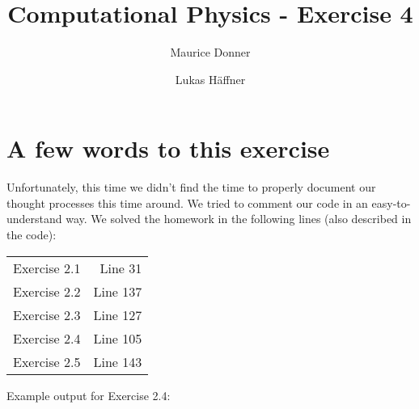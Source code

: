 \documentclass{article}
\title{Computational Physics - Exercise 4}
\author{Maurice Donner \and Lukas Häffner}
\begin{document}
\maketitle

\section{A few words to this exercise}

Unfortunately, this time we didn't find the time to properly document our
thought processes this time around. We tried to comment our code in an
easy-to-understand way. We solved the homework in the following lines
(also described in the code):\\ 
\begin{center}
\begin{tabular}{lr}
    Exercise 2.1 & Line 31\\
    Exercise 2.2 & Line 137 \\
    Exercise 2.3 & Line 127 \\
    Exercise 2.4 & Line 105 \\
    Exercise 2.5 & Line 143 
\end{tabular}
\end{center}
\vspace{10pt}
Example output for Exercise 2.4:
\end{document}
